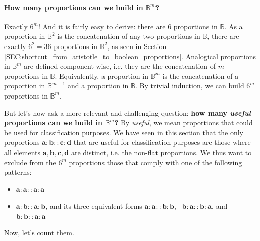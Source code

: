 \paragraph{How many proportions can we build in $\mathbb{B}^m$?\\}
\label{SEC:number_of_parallelograms_in_Bm}

Exactly $6^m$! And it is fairly easy to derive: there are $6$ proportions in
$\mathbb{B}$. As a proportion in $\mathbb{B}^2$ is the concatenation of any two
proportions in $\mathbb{B}$, there are exactly $6^2 = 36$ proportions in
$\mathbb{B}^2$, as seen in Section
\ref{SEC:shortcut_from_aristotle_to_boolean_proportions}. Analogical
proportions in $\mathbb{B}^m$ are defined component-wise, i.e. they are the
concatenation of $m$ proportions in $\mathbb{B}$. Equivalently, a proportion in
$\mathbb{B}^m$ is the concatenation of a proportion in $\mathbb{B}^{m - 1}$ and
a proportion in $\mathbb{B}$. By trivial induction, we can build $6^m$
proportions in $\mathbb{B}^m$.

But let's now ask a more relevant and challenging question: \textbf{how many
\textit{useful} proportions can we build in $\mathbb{B}^m$?} By
\textit{useful}, we mean proportions that could be used for classification
purposes.  We have seen in this section that the only proportions
$\mathbf{a} : \mathbf{b} :: \mathbf{c} : \mathbf{d}$ that are useful for
classification purposes are those where all elements $\mathbf{a}, \mathbf{b},
\mathbf{c}, \mathbf{d}$ are distinct, i.e. the non-flat proportions. We thus
want to exclude from the $6^m$ proportions those that comply with one of the
following patterns:

\begin{itemize}
  \item $\mathbf{a}: \mathbf{a} :: \mathbf{a} : \mathbf{a}$
  \item $\mathbf{a}: \mathbf{b} :: \mathbf{a} : \mathbf{b}$, and its three
    equivalent forms $\mathbf{a}: \mathbf{a} :: \mathbf{b} : \mathbf{b}$,~
    $\mathbf{b}: \mathbf{a} :: \mathbf{b} : \mathbf{a}$, and $\mathbf{b}:
    \mathbf{b} :: \mathbf{a} : \mathbf{a}$
\end{itemize}

Now, let's count them.

